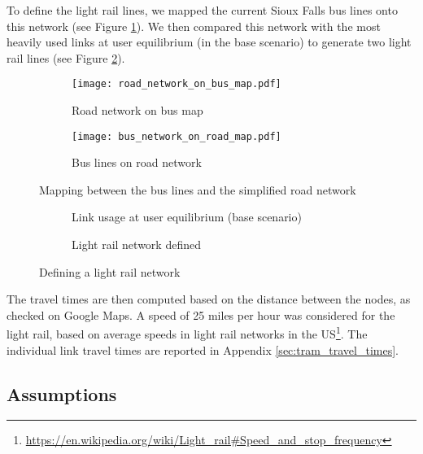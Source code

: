To define the light rail lines, we mapped the current Sioux Falls bus lines onto this network (see Figure \ref{fig:mapping_bus}). We then compared this network with the most heavily used links at user equilibrium (in the base scenario) to generate two light rail lines (see Figure \ref{fig:light_rail_network}).

\begin{figure}
    \centering
    \begin{subfigure}{.45\textwidth}
        \centering
        \texttt{[image: road\_network\_on\_bus\_map.pdf]}
        \caption{Road network on bus map}
    \end{subfigure}%
    \begin{subfigure}{.45\textwidth}
        \centering
        \texttt{[image: bus\_network\_on\_road\_map.pdf]}
        \caption{Bus lines on road network}
    \end{subfigure}%
    \caption{Mapping between the bus lines and the simplified road network}
    \label{fig:mapping_bus}
\end{figure}

\begin{figure}
    \centering
    \begin{subfigure}{.45\textwidth}
        \centering
        \resizebox{.7\textwidth}{!}{}
        \caption{Link usage at user equilibrium (base scenario)}
    \end{subfigure}%
    \begin{subfigure}{.45\textwidth}
        \centering
        \resizebox{.7\textwidth}{!}{}
        \caption{Light rail network defined}
    \end{subfigure}%
    \caption{Defining a light rail network}
    \label{fig:light_rail_network}
\end{figure}

The travel times are then computed based on the distance between the nodes, as checked on Google Maps. A speed of 25 miles per hour was considered for the light rail, based on average speeds in light rail networks in the US\footnote{\url{https://en.wikipedia.org/wiki/Light_rail\#Speed_and_stop_frequency}}. The individual link travel times are reported in Appendix \ref{sec:tram_travel_times}.


\subsection{Assumptions}

